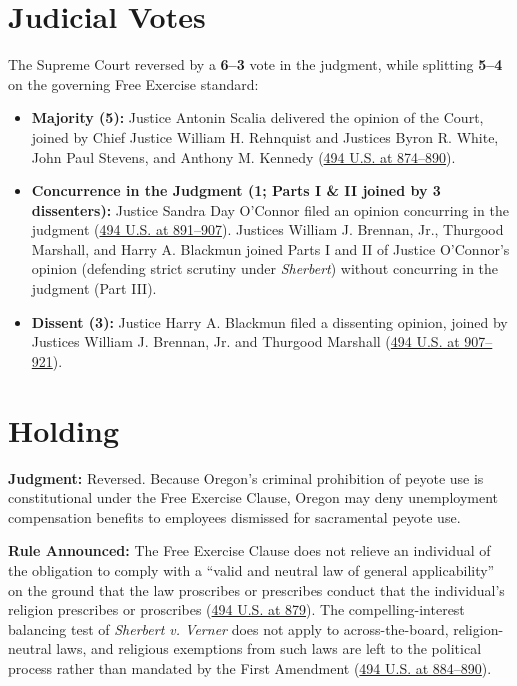 \documentclass[12pt]{article}
\begin{document}
\section{Judicial Votes}

The Supreme Court reversed by a \textbf{6--3} vote in the judgment, while splitting \textbf{5--4} on the governing Free Exercise standard:

\begin{itemize}
  \item \textbf{Majority (5):} Justice Antonin Scalia delivered the opinion of the Court, joined by Chief Justice William H. Rehnquist and Justices Byron R. White, John Paul Stevens, and Anthony M. Kennedy (\href{https://supreme.justia.com/cases/federal/us/494/872/}{494 U.S. at 874--890}).
  \item \textbf{Concurrence in the Judgment (1; Parts I \& II joined by 3 dissenters):} Justice Sandra Day O'Connor filed an opinion concurring in the judgment (\href{https://supreme.justia.com/cases/federal/us/494/872/}{494 U.S. at 891--907}). Justices William J. Brennan, Jr., Thurgood Marshall, and Harry A. Blackmun joined Parts I and II of Justice O'Connor's opinion (defending strict scrutiny under \textit{Sherbert}) without concurring in the judgment (Part III).
  \item \textbf{Dissent (3):} Justice Harry A. Blackmun filed a dissenting opinion, joined by Justices William J. Brennan, Jr. and Thurgood Marshall (\href{https://supreme.justia.com/cases/federal/us/494/872/}{494 U.S. at 907--921}).
\end{itemize}

\section{Holding}

\textbf{Judgment:} Reversed. Because Oregon's criminal prohibition of peyote use is constitutional under the Free Exercise Clause, Oregon may deny unemployment compensation benefits to employees dismissed for sacramental peyote use.

\textbf{Rule Announced:} The Free Exercise Clause does not relieve an individual of the obligation to comply with a ``valid and neutral law of general applicability'' on the ground that the law proscribes or prescribes conduct that the individual's religion prescribes or proscribes (\href{https://supreme.justia.com/cases/federal/us/494/872/}{494 U.S. at 879}). The compelling-interest balancing test of \textit{Sherbert v. Verner} does not apply to across-the-board, religion-neutral laws, and religious exemptions from such laws are left to the political process rather than mandated by the First Amendment (\href{https://supreme.justia.com/cases/federal/us/494/872/}{494 U.S. at 884--890}).
\end{document}
